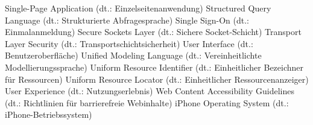     {Single-Page Application (dt.: Einzelseitenanwendung)}
    {Structured Query Language (dt.: Strukturierte Abfragesprache)}
    {Single Sign-On (dt.: Einmalanmeldung)}
    {Secure Sockets Layer (dt.: Sichere Socket-Schicht)}
    {Transport Layer Security (dt.: Transportschichtsicherheit)}
     {User Interface (dt.: Benutzeroberfläche)}
    {Unified Modeling Language (dt.: Vereinheitlichte Modellierungssprache)}
    {Uniform Resource Identifier (dt.: Einheitlicher Bezeichner für Ressourcen)}
    {Uniform Resource Locator (dt.: Einheitlicher Ressourcenanzeiger)}
     {User Experience (dt.: Nutzungserlebnis)}
 {Web Content Accessibility Guidelines (dt.: Richtlinien für barrierefreie Webinhalte)}
    {iPhone Operating System (dt.: iPhone-Betriebssystem)}








